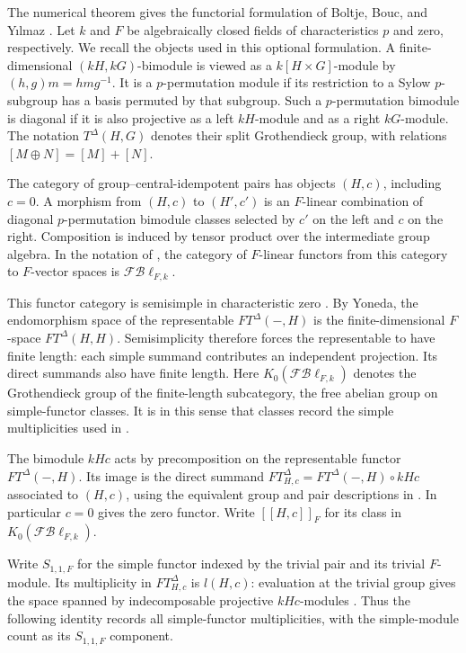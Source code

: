 The numerical theorem gives the functorial formulation of
Boltje, Bouc, and Y\i lmaz \cite[Conjecture~3.3]{BBY2026}.
Let $k$ and $F$ be algebraically closed fields of characteristics $p$ and
zero, respectively. We recall the objects used in this optional
formulation. A finite-dimensional $(kH,kG)$-bimodule is viewed as a
$k[H\times G]$-module by $(h,g)m=hmg^{-1}$. It is a
$p$-permutation module if its restriction to a Sylow $p$-subgroup
has a basis permuted by that subgroup. Such a $p$-permutation bimodule
is diagonal if it is also
projective as a left $kH$-module and as a right $kG$-module.
The notation $T^\Delta(H,G)$ denotes their split Grothendieck group,
with relations $[M\oplus N]=[M]+[N]$.

The category of group--central-idempotent pairs has objects $(H,c)$,
including $c=0$. A morphism from $(H,c)$ to $(H',c')$ is an
$F$-linear combination of diagonal $p$-permutation bimodule classes
selected by $c'$ on the left and $c$ on the right. Composition is
induced by tensor product over the intermediate group algebra.
In the notation of \cite[Section~2]{BBY2026}, the category of
$F$-linear functors from this category to $F$-vector spaces is
$\mathcal F\mathcal B\ell_{F,k}$.

This functor category is semisimple in characteristic zero
\cite[Section~2.5]{BBY2026}. By Yoneda, the endomorphism space of
the representable $FT^\Delta(-,H)$ is the finite-dimensional
$F$-space $FT^\Delta(H,H)$. Semisimplicity therefore forces the
representable to have finite length: each simple summand contributes an
independent projection. Its direct summands also have finite length.
Here $K_0(\mathcal F\mathcal B\ell_{F,k})$ denotes the Grothendieck
group of the finite-length subcategory, the free abelian group on
simple-functor classes. It is in this sense that classes record the
simple multiplicities used in \cite[Sections~2.5 and~3]{BBY2026}.

The bimodule $kHc$ acts by precomposition on the representable
functor $FT^\Delta(-,H)$. Its image is the direct summand
$FT^\Delta_{H,c}=FT^\Delta(-,H)\circ kHc$ associated to $(H,c)$,
using the equivalent group and pair descriptions in
\cite[Sections~2.3--2.4]{BBY2026}. In particular $c=0$ gives the
zero functor. Write $[[H,c]]_F$ for its class in
$K_0(\mathcal F\mathcal B\ell_{F,k})$.

Write $S_{1,1,F}$ for the simple
functor indexed by the trivial pair and its trivial $F$-module.
Its multiplicity in $FT^\Delta_{H,c}$ is $l(H,c)$: evaluation at
the trivial group gives the space spanned by indecomposable projective
$kHc$-modules \cite[proof of Theorem~3.4]{BBY2026}. Thus the
following identity records all simple-functor multiplicities, with
the simple-module count as its $S_{1,1,F}$ component.

